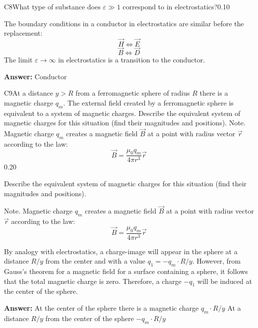 \documentclass[11pt,a4paper]{article}
\begin{document}
\begin{solcard}{C8}{What type of substance does $\varepsilon \gg 1$ correspond to in electrostatics?}{0.10}

The boundary conditions in a conductor in electrostatics are similar before the replacement: $$\vec{H} \Leftrightarrow \vec{E}$$$$\vec{B} \Leftrightarrow  \vec{D}$$ The limit $\varepsilon \to \infty$ in electrostatics is a transition to the conductor.

\par\smallskip\noindent\textbf{Answer:} Conductor
\end{solcard}

\begin{solcard}{C9}{At a distance $y>R$ from a ferromagnetic sphere of radius $R$ there is a magnetic charge $q_m$.  The external field created by a ferromagnetic sphere is equivalent to a system of magnetic charges. Describe the equivalent system of magnetic charges for this situation (find their magnitudes and positions). Note. Magnetic charge $q_m$ creates a magnetic field $\vec{B}$ at a point with radius vector $\vec{r}$ according to the law: \[\vec{B}=\dfrac{\mu_0q_m}{4\pi r^3}\vec{r}\]}{0.20}

Describe the equivalent system of magnetic charges for this situation (find their magnitudes and positions).


Note. Magnetic charge $q_m$ creates a magnetic field $\vec{B}$ at a point with radius vector $\vec{r}$ according to the law: \[\vec{B}=\dfrac{\mu_0q_m}{4\pi r^3}\vec{r}\]


By analogy with electrostatics, a charge-image will appear in the sphere at a distance $R/y$ from the center and with a value $q_1 = - q_m \cdot R/y $. However, from Gauss's theorem for a magnetic field for a surface containing a sphere, it follows that the total magnetic charge is zero. Therefore, a charge $-q_1$ will be induced at the center of the sphere.

\par\smallskip\noindent\textbf{Answer:} At the center of the sphere there is a magnetic charge $q_m \cdot R/y$ At a distance $R/y$ from the center of the sphere $-q_m \cdot R/y$
\end{solcard}
\end{document}
